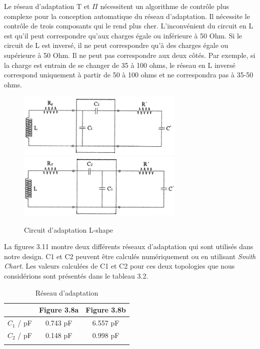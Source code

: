 \documentclass[11pt, a4paper, twoside]{book}
\begin{document}
Le réseau d'adaptation T et \(\Pi\) nécessitent un algorithme de contrôle plus complexe pour la conception automatique du réseau d'adaptation. Il nécessite le contrôle de trois composants qui le rend plus cher. L'inconvénient du circuit en L est qu'il peut correspondre qu'aux charges égale ou inférieure à 50 Ohm. Si le circuit de L est inversé, il ne peut correspondre qu'à des charges égale ou supérieure à 50 Ohm. Il ne peut pas correspondre aux deux côtés. Par exemple, si la charge est entrain de se changer de 35 à 100 ohms, le réseau en L inversé correspond uniquement à partir de 50 à 100 ohms et ne correspondra pas à 35-50 ohms.
\begin{figure}[H]
\centering
\includegraphics[width=8cm]{matcha}
\includegraphics[width=8cm]{matchb}
\caption{Circuit d'adaptation L-shape}
\end{figure}
La figures 3.11 montre deux différents réseaux d'adaptation qui sont utilisés dans notre design. C1 et C2 peuvent être calculés numériquement ou en utilisant \emph {Smith Chart}. Les valeurs calculées de C1 et C2 pour ces deux topologies que nous considérions sont présentés dans le tableau 3.2.\\
\begin{longtable}[c]{| c | c | c |}
 \hline
  & Figure 3.8a & Figure 3.8b\\
 \hline
 \(C_{1}\) / pF & 0.743 pF & 6.557 pF\\
 \hline
 \(C_{2}\) / pF & 0.148 pF & 0.998 pF\\
 \hline
\caption{Réseau d'adaptation}
\end{longtable}
\end{document}
